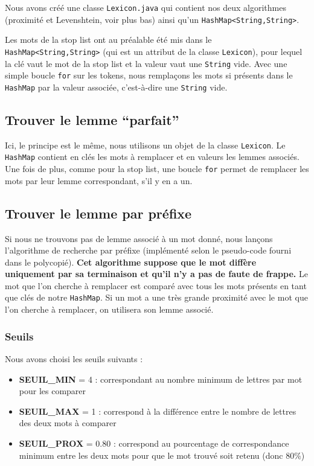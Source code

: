 \medskip

Nous avons créé une classe \lstinline{Lexicon.java} qui contient nos deux algorithmes (proximité et Levenshtein, voir plus bas) ainsi qu'un \lstinline{HashMap<String,String>}.

\medskip

Les mots de la stop list ont au préalable été mis dans le \lstinline{HashMap<String,String>} (qui est un attribut de la classe \lstinline{Lexicon}), pour lequel la clé vaut le mot de la stop list et la valeur vaut une \lstinline{String} vide. Avec une simple boucle \lstinline{for} sur les tokens, nous remplaçons les mots si présents dans le \lstinline{HashMap} par la valeur associée, c'est-à-dire une \lstinline{String} vide.

\subsection{Trouver le lemme ``parfait''}

Ici, le principe est le même, nous utilisons un objet de la classe \lstinline{Lexicon}. Le \lstinline{HashMap} contient en clés les mots à remplacer et en valeurs les lemmes associés. Une fois de plus, comme pour la stop list, une boucle \lstinline{for} permet de remplacer les mots par leur lemme correspondant, s'il y en a un.

\subsection{Trouver le lemme par préfixe}

Si nous ne trouvons pas de lemme associé à un mot donné, nous lançons l'algorithme de recherche par préfixe (implémenté selon le pseudo-code fourni dans le polycopié). \textbf{Cet algorithme suppose que le mot diffère uniquement par sa terminaison et qu'il n'y a pas de faute de frappe.} Le mot que l'on cherche à remplacer est comparé avec tous les mots présents en tant que clés de notre \lstinline{HashMap}. Si un mot a une très grande proximité avec le mot que l'on cherche à remplacer, on utilisera son lemme associé.

\subsubsection{Seuils}

Nous avons choisi les seuils suivants :

\begin{itemize}
    \item \textbf{SEUIL\_MIN} = 4 : correspondant au nombre minimum de lettres par mot pour les comparer
    \item \textbf{SEUIL\_MAX} = 1 : correspond à la différence entre le nombre de lettres des deux mots à comparer
    \item \textbf{SEUIL\_PROX} = 0.80 : correspond au pourcentage de correspondance minimum entre les deux mots pour que le mot trouvé soit retenu (donc 80\%)
\end{itemize}

